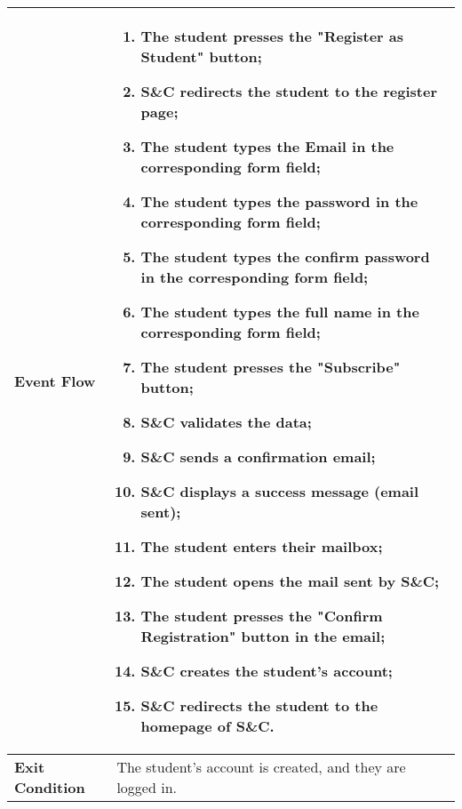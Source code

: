 \begin{enumerate}[label=\textbf{[US\arabic*]}, left = 0pt, align = left]
\begin{longtable}{|l|p{11cm}|}
                \textbf{Event Flow} &
                    \begin{enumerate}[label=\arabic*., itemsep=0.2em]
                        \item The student presses the "Register as Student" button;
                        \item S\&C redirects the student to the register page;
                        \item The student types the Email in the corresponding form field;
                        \item The student types the password in the corresponding form field;
                        \item The student types the confirm password in the corresponding form field;
                        \item The student types the full name in the corresponding form field;
                        \item The student presses the "Subscribe" button;
                        \item S\&C validates the data;
                        \item S\&C sends a confirmation email;
                        \item S\&C displays a success message (email sent);
                        \item The student enters their mailbox;
                        \item The student opens the mail sent by S\&C;
                        \item The student presses the "Confirm Registration" button in the email;
                        \item S\&C creates the student's account;
                        \item S\&C redirects the student to the homepage of S\&C.
                    \end{enumerate} \\
                \hline
                
                \textbf{Exit Condition} & 
                    The student's account is created, and they are logged in. \\
                \hline
                

\end{longtable}
\end{enumerate}
